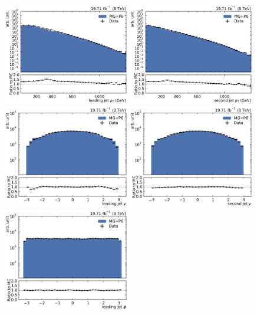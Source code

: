 \begin{figure}[htbp]
    \centering
    \includegraphics[width=0.49\textwidth]{figures/measurement/jet_quantities_jet1pt.pdf}\hfill
    \includegraphics[width=0.49\textwidth]{figures/measurement/jet_quantities_jet2pt.pdf}
    \includegraphics[width=0.49\textwidth]{figures/measurement/jet_quantities_jet1rap.pdf}\hfill
    \includegraphics[width=0.49\textwidth]{figures/measurement/jet_quantities_jet2rap.pdf}
    \includegraphics[width=0.49\textwidth]{figures/measurement/jet_quantities_jet1phi.pdf}\hfill

\end{figure}
